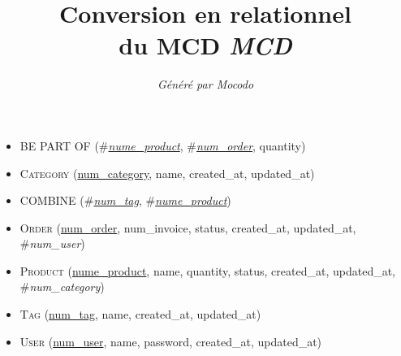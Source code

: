 \documentclass[a4paper]{article}
\title{Conversion en relationnel\\du MCD \emph{MCD}}
\author{\emph{Généré par Mocodo}}
\newcommand{\relat}[1]{\textsc{#1}}
\newcommand{\attr}[1]{#1}
\newcommand{\prim}[1]{\uline{#1}}
\newcommand{\foreign}[1]{\#\textsl{#1}}
\begin{document}
\maketitle

\begin{itemize}
  \item \relat{BE PART OF} (\foreign{\prim{nume_product}}, \foreign{\prim{num_order}}, \attr{quantity})
  \item \relat{Category} (\prim{num_category}, \attr{name}, \attr{created_at}, \attr{updated_at})
  \item \relat{COMBINE} (\foreign{\prim{num_tag}}, \foreign{\prim{nume_product}})
  \item \relat{Order} (\prim{num_order}, \attr{num_invoice}, \attr{status}, \attr{created_at}, \attr{updated_at}, \foreign{num_user})
  \item \relat{Product} (\prim{nume_product}, \attr{name}, \attr{quantity}, \attr{status}, \attr{created_at}, \attr{updated_at}, \foreign{num_category})
  \item \relat{Tag} (\prim{num_tag}, \attr{name}, \attr{created_at}, \attr{updated_at})
  \item \relat{User} (\prim{num_user}, \attr{name}, \attr{password}, \attr{created_at}, \attr{updated_at})
\end{itemize}
\end{document}

